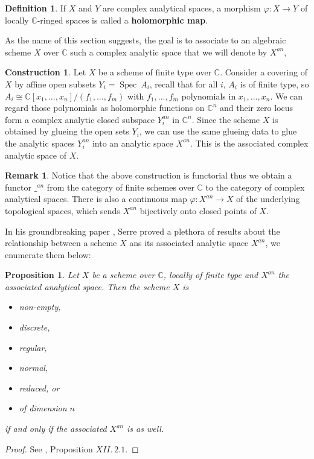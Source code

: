\documentclass{article}
\theoremstyle{plain}
\newtheorem{proposition}[theorem]{Proposition}
\theoremstyle{definition}
\newtheorem{definition}[theorem]{Definition}
\newtheorem{remark}{Remark}
\newtheorem{construction}[theorem]{Construction}
\DeclareMathOperator{\Spec}{Spec}
\begin{document}
\begin{definition}
    If $X$ and $Y$ are complex analytical spaces, a morphism $\varphi:X\rightarrow Y$ of locally $\mathbb{C}$-ringed spaces is called a \textbf{holomorphic map}. 
\end{definition}

\noindent As the name of this section suggests, the goal is to associate to an algebraic scheme $X$ over $\mathbb{C}$ such a complex analytic space that we will denote by $X^{an}$,

\begin{construction}
    Let $X$ be a scheme of finite type over $\mathbb{C}$. 
    Consider a covering of $X$ by affine open subsets $Y_i=\Spec\:A_i$, recall that for all $i$, $A_i$ is of finite type, so $A_i \cong \mathbb{C}[x_1, ..., x_n]/(f_1, ..., f_m)$ with $f_1,...,f_m$ polynomials in $x_1,...,x_n$.
    We can regard those polynomials as holomorphic functions on $\mathbb{C}^n$ and their zero locus form a complex analytic closed subspace $Y_i^{an}$ in $\mathbb{C}^n$.
    Since the scheme $X$ is obtained by glueing the open sets $Y_i$, we can use the same glueing data to glue the analytic spaces $Y_i^{an}$ into an analytic space $X^{an}$. This is the associated complex analytic space of $X$.
\end{construction}



\begin{remark}
    Notice that the above construction is functorial thus we obtain a functor $\_^{an}$ from the category of finite schemes over $\mathbb{C}$ to the category of complex analytical spaces.
    There is also a continuous map $\varphi : X^{an}\rightarrow X$ of the underlying topological spaces, which sends $X^{an}$ bijectively onto closed points of $X$.
\end{remark}



\noindent In his groundbreaking paper \cite{Serre}, Serre proved a plethora of results about the relationship between a scheme $X$ ans its associated analytic space $X^{an}$, we enumerate them below:

\begin{proposition}
\label{analytification_space}
    Let $X$ be a scheme over $\mathbb{C}$, locally of finite type and $X^{an}$ the associated analytical space. 
    Then the scheme $X$ is 
    \begin{itemize}
        \item[$a)$] non-empty,
        \item[$b)$] discrete,
        \item[$c)$] regular,
        \item[$d)$] normal, 
        \item[$e)$] reduced, or
        \item[$f)$] of dimension $n$
    \end{itemize}
    if and only if the associated $X^{an}$ is as well.
\end{proposition}
\begin{proof}
    See \cite{SGA}, Proposition $XII.\:2.1$.
\end{proof}
\end{document}
